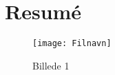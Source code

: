 \chapter{Resumé}

\begin{figure}[h!]\centering
	\texttt{[image: Filnavn]}
	\caption{Billede 1}
	\label{billede1}
\end{figure}